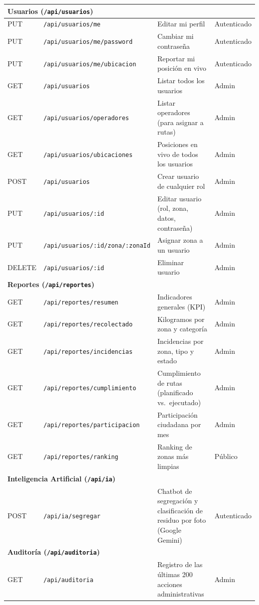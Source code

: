 \documentclass[11pt,a4paper]{article}
\begin{document}
\begin{longtable}{|p{1.6cm}|p{4.6cm}|p{6cm}|p{1.8cm}|}
\multicolumn{4}{|l|}{\cellcolor{grisclaro}\textbf{Usuarios (\texttt{/api/usuarios})}} \\
\hline
PUT & \texttt{/api/usuarios/me} & Editar mi perfil & Autenticado \\
\hline
PUT & \texttt{/api/usuarios/me/password} & Cambiar mi contraseña & Autenticado \\
\hline
PUT & \texttt{/api/usuarios/me/ubicacion} & Reportar mi posición en vivo & Autenticado \\
\hline
GET & \texttt{/api/usuarios} & Listar todos los usuarios & Admin \\
\hline
GET & \texttt{/api/usuarios/operadores} & Listar operadores (para asignar a rutas) & Admin \\
\hline
GET & \texttt{/api/usuarios/ubicaciones} & Posiciones en vivo de todos los usuarios & Admin \\
\hline
POST & \texttt{/api/usuarios} & Crear usuario de cualquier rol & Admin \\
\hline
PUT & \texttt{/api/usuarios/:id} & Editar usuario (rol, zona, datos, contraseña) & Admin \\
\hline
PUT & \texttt{/api/usuarios/:id/zona/:zonaId} & Asignar zona a un usuario & Admin \\
\hline
DELETE & \texttt{/api/usuarios/:id} & Eliminar usuario & Admin \\
\hline

\multicolumn{4}{|l|}{\cellcolor{grisclaro}\textbf{Reportes (\texttt{/api/reportes})}} \\
\hline
GET & \texttt{/api/reportes/resumen} & Indicadores generales (KPI) & Admin \\
\hline
GET & \texttt{/api/reportes/recolectado} & Kilogramos por zona y categoría & Admin \\
\hline
GET & \texttt{/api/reportes/incidencias} & Incidencias por zona, tipo y estado & Admin \\
\hline
GET & \texttt{/api/reportes/cumplimiento} & Cumplimiento de rutas (planificado vs.\ ejecutado) & Admin \\
\hline
GET & \texttt{/api/reportes/participacion} & Participación ciudadana por mes & Admin \\
\hline
GET & \texttt{/api/reportes/ranking} & Ranking de zonas más limpias & Público \\
\hline

\multicolumn{4}{|l|}{\cellcolor{grisclaro}\textbf{Inteligencia Artificial (\texttt{/api/ia})}} \\
\hline
POST & \texttt{/api/ia/segregar} & Chatbot de segregación y clasificación de residuo por foto (Google Gemini) & Autenticado \\
\hline

\multicolumn{4}{|l|}{\cellcolor{grisclaro}\textbf{Auditoría (\texttt{/api/auditoria})}} \\
\hline
GET & \texttt{/api/auditoria} & Registro de las últimas 200 acciones administrativas & Admin \\
\hline
\end{longtable}
\end{document}
